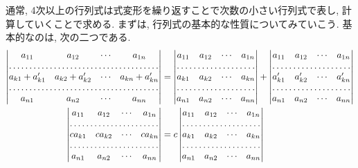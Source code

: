         通常, 4次以上の行列式は式変形を繰り返すことで次数の小さい行列式で表し, 計算していくことで求める. 
        まずは, 行列式の基本的な性質についてみていこう. 基本的なのは, 次の二つである.
        \begin{align}
            \begin{vmatrix}
                a_{11} & a_{12} & \cdots & a_{1n} \\
                \hdotsfor{4}\\
                a_{k1}+a_{k1}' & a_{k2}+a_{k2}' & \cdots & a_{kn}+a_{kn}' \\
                \hdotsfor{4}\\
                a_{n1} & a_{n2} & \cdots & a_{nn}
            \end{vmatrix}
            &=\begin{vmatrix}
                a_{11} & a_{12} & \cdots & a_{1n} \\
                \hdotsfor{4}\\
                a_{k1} & a_{k2} & \cdots & a_{kn} \\
                \hdotsfor{4}\\
                a_{n1} & a_{n2} & \cdots & a_{nn}
            \end{vmatrix}
            +\begin{vmatrix}
                a_{11} & a_{12} & \cdots & a_{1n} \\
                \hdotsfor{4}\\
                a_{k1}' & a_{k2}' & \cdots & a_{kn}' \\
                \hdotsfor{4}\\
                a_{n1} & a_{n2} & \cdots & a_{nn}
            \end{vmatrix}
            \label{eq:線形代数:行列式の和}\\
            \begin{vmatrix}
                a_{11} & a_{12} & \cdots & a_{1n} \\
                \hdotsfor{4}\\
                ca_{k1} & ca_{k2} & \cdots & ca_{kn} \\
                \hdotsfor{4}\\
                a_{n1} & a_{n2} & \cdots & a_{nn}
            \end{vmatrix}
            &=c\begin{vmatrix}
                a_{11} & a_{12} & \cdots & a_{1n} \\
                \hdotsfor{4}\\
                a_{k1} & a_{k2} & \cdots & a_{kn} \\
                \hdotsfor{4}\\
                a_{n1} & a_{n2} & \cdots & a_{nn}
            \end{vmatrix}
            \label{eq:線形代数:行列式のスカラー倍}
        \end{align}
